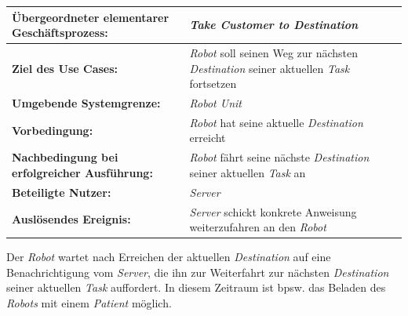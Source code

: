 			\begin{table}[H]
				\centering
				\begin{tabularx}{\textwidth}{|p{5cm}|X|}
					\hline
					\textbf{Übergeordneter elementarer Geschäftsprozess:} & \emph{Take Customer to Destination}  \\ \hline
					\textbf{Ziel des Use Cases:} & \emph{Robot} soll seinen Weg zur nächsten \emph{Destination} seiner aktuellen \emph{Task} fortsetzen \\ \hline
					\textbf{Umgebende Systemgrenze:} & \emph{Robot Unit} \\ \hline
					\textbf{Vorbedingung:} & \emph{Robot} hat seine aktuelle \emph{Destination} erreicht \\ \hline
					\textbf{Nachbedingung bei erfolgreicher Ausführung:} & \emph{Robot} fährt seine nächste \emph{Destination} seiner aktuellen \emph{Task} an \\ \hline
					\textbf{Beteiligte Nutzer:} & \emph{Server} \\ \hline
					\textbf{Auslösendes Ereignis:} & \emph{Server} schickt konkrete Anweisung weiterzufahren an den \emph{Robot} \\
					\hline
				\end{tabularx}
			\end{table}
			
			Der \emph{Robot} wartet nach Erreichen der aktuellen \emph{Destination} auf eine Benachrichtigung vom \emph{Server}, die ihn zur Weiterfahrt zur nächsten \emph{Destination} seiner aktuellen \emph{Task} auffordert. In diesem Zeitraum ist bpsw. das Beladen des \emph{Robots} mit einem \emph{Patient} möglich.
			
			
			\pagebreak
